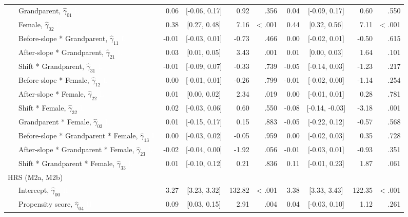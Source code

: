 \documentclass[
  english,
  man, noextraspace]{apa7}
\newenvironment{lltable}{\begin{landscape}\begin{center}\begin{ThreePartTable}}{\end{ThreePartTable}\end{center}\end{landscape}}
\begin{document}
\begin{lltable}
{\begin{longtable}{lrcrrrcrr}
\ \ \ Grandparent, $\hat{\gamma}_{01}$ \textcolor{white}{L} & 0.06 & [-0.06, 0.17] & 0.92 & .356 & 0.04 & [-0.09, 0.17] & 0.60 & .550\\
\ \ \ Female, $\hat{\gamma}_{02}$ \textcolor{white}{L} & 0.38 & [0.27, 0.48] & 7.16 & < .001 & 0.44 & [0.32, 0.56] & 7.11 & < .001\\
\ \ \ Before-slope * Grandparent, $\hat{\gamma}_{11}$ \textcolor{white}{L} & -0.01 & [-0.03, 0.01] & -0.73 & .466 & 0.00 & [-0.02, 0.01] & -0.50 & .615\\
\ \ \ After-slope * Grandparent, $\hat{\gamma}_{21}$ \textcolor{white}{L} & 0.03 & [0.01, 0.05] & 3.43 & .001 & 0.01 & [0.00, 0.03] & 1.64 & .101\\
\ \ \ Shift * Grandparent, $\hat{\gamma}_{31}$ \textcolor{white}{L} & -0.01 & [-0.09, 0.07] & -0.33 & .739 & -0.05 & [-0.14, 0.03] & -1.23 & .217\\
\ \ \ Before-slope * Female, $\hat{\gamma}_{12}$ \textcolor{white}{L} & 0.00 & [-0.01, 0.01] & -0.26 & .799 & -0.01 & [-0.02, 0.00] & -1.14 & .254\\
\ \ \ After-slope * Female, $\hat{\gamma}_{22}$ \textcolor{white}{L} & 0.01 & [0.00, 0.02] & 2.34 & .019 & 0.00 & [-0.01, 0.01] & 0.28 & .781\\
\ \ \ Shift * Female, $\hat{\gamma}_{32}$ \textcolor{white}{L} & 0.02 & [-0.03, 0.06] & 0.60 & .550 & -0.08 & [-0.14, -0.03] & -3.18 & .001\\
\ \ \ Grandparent * Female, $\hat{\gamma}_{03}$ \textcolor{white}{L} & 0.01 & [-0.15, 0.17] & 0.15 & .883 & -0.05 & [-0.22, 0.12] & -0.57 & .568\\
\ \ \ Before-slope * Grandparent * Female, $\hat{\gamma}_{13}$ \textcolor{white}{L} & 0.00 & [-0.03, 0.02] & -0.05 & .959 & 0.00 & [-0.02, 0.03] & 0.35 & .728\\
\ \ \ After-slope * Grandparent * Female, $\hat{\gamma}_{23}$ \textcolor{white}{L} & -0.02 & [-0.04, 0.00] & -1.92 & .056 & -0.01 & [-0.03, 0.01] & -0.93 & .351\\
\ \ \ Shift * Grandparent * Female, $\hat{\gamma}_{33}$ \textcolor{white}{L} & 0.01 & [-0.10, 0.12] & 0.21 & .836 & 0.11 & [-0.01, 0.23] & 1.87 & .061\\
HRS (M2a, M2b) &  &  &  &  &  &  &  & \\
\ \ \ Intercept, $\hat{\gamma}_{00}$ \textcolor{white}{H} & 3.27 & [3.23, 3.32] & 132.82 & < .001 & 3.38 & [3.33, 3.43] & 122.35 & < .001\\
\ \ \ Propensity score, $\hat{\gamma}_{04}$ \textcolor{white}{H} & 0.09 & [0.03, 0.15] & 2.91 & .004 & 0.04 & [-0.03, 0.10] & 1.12 & .261\\

\end{longtable}}
\end{lltable}
\end{document}
